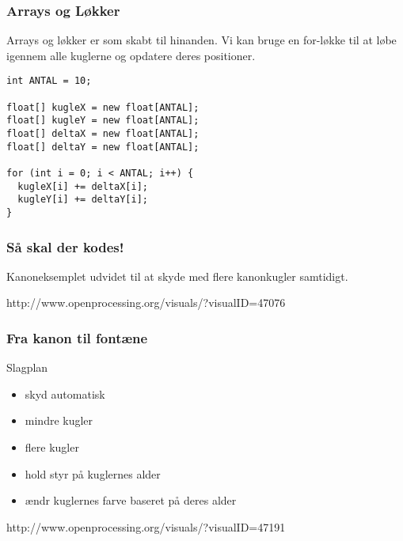 \documentclass{beamer}
\begin{document}
\begin{frame}[fragile]
  \frametitle{Arrays og Løkker}
  
  Arrays og løkker er som skabt til hinanden. Vi kan bruge en for-løkke til 
  at løbe igennem alle kuglerne og opdatere deres positioner.

\begin{verbatim}
int ANTAL = 10;

float[] kugleX = new float[ANTAL];
float[] kugleY = new float[ANTAL];
float[] deltaX = new float[ANTAL];
float[] deltaY = new float[ANTAL];

for (int i = 0; i < ANTAL; i++) {
  kugleX[i] += deltaX[i];
  kugleY[i] += deltaY[i];
}
\end{verbatim}
  
   
\end{frame}

\begin{frame}[fragile]
  \frametitle{Så skal der kodes!}
  
  Kanoneksemplet udvidet til at skyde med flere kanonkugler samtidigt.
  
  http://www.openprocessing.org/visuals/?visualID=47076
    
\end{frame}


\begin{frame}[fragile]
  \frametitle{Fra kanon til fontæne}
  
  \begin{block}{Slagplan}
    \begin{itemize}
    \item skyd automatisk
    \item mindre kugler
    \item flere kugler
    \item hold styr på kuglernes alder
    \item ændr kuglernes farve baseret på deres alder
    \end{itemize}
  \end{block}
  
  http://www.openprocessing.org/visuals/?visualID=47191
    
\end{frame}
\end{document}
